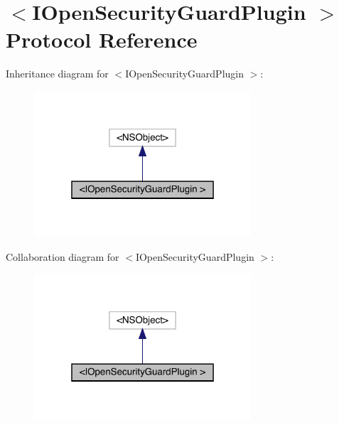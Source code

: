 \hypertarget{protocol_i_open_security_guard_plugin_01-p}{}\section{$<$I\+Open\+Security\+Guard\+Plugin $>$ Protocol Reference}
\label{protocol_i_open_security_guard_plugin_01-p}


Inheritance diagram for $<$I\+Open\+Security\+Guard\+Plugin $>$\+:\nopagebreak
\begin{figure}[H]
\begin{center}
\leavevmode
\includegraphics[width=229pt]{protocol_i_open_security_guard_plugin_01-p__inherit__graph}
\end{center}
\end{figure}


Collaboration diagram for $<$I\+Open\+Security\+Guard\+Plugin $>$\+:\nopagebreak
\begin{figure}[H]
\begin{center}
\leavevmode
\includegraphics[width=229pt]{protocol_i_open_security_guard_plugin_01-p__coll__graph}
\end{center}
\end{figure}
